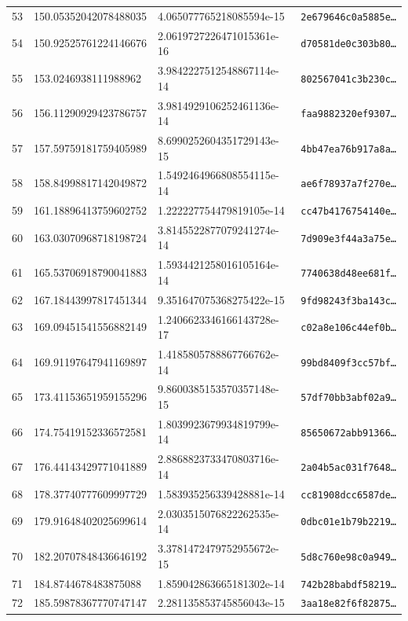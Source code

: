 \documentclass[11pt]{article}
\begin{document}
\begin{center}
\begin{longtable}{rlll}
53 & 150.05352042078488035 & 4.065077765218085594e-15 & \texttt{2e679646c0a5885e\dots} \\
54 & 150.92525761224146676 & 2.0619727226471015361e-16 & \texttt{d70581de0c303b80\dots} \\
55 & 153.0246938111988962 & 3.9842227512548867114e-14 & \texttt{802567041c3b230c\dots} \\
56 & 156.11290929423786757 & 3.9814929106252461136e-14 & \texttt{faa9882320ef9307\dots} \\
57 & 157.59759181759405989 & 8.6990252604351729143e-15 & \texttt{4bb47ea76b917a8a\dots} \\
58 & 158.84998817142049872 & 1.5492464966808554115e-14 & \texttt{ae6f78937a7f270e\dots} \\
59 & 161.18896413759602752 & 1.222227754479819105e-14 & \texttt{cc47b4176754140e\dots} \\
60 & 163.03070968718198724 & 3.8145522877079241274e-14 & \texttt{7d909e3f44a3a75e\dots} \\
61 & 165.53706918790041883 & 1.5934421258016105164e-14 & \texttt{7740638d48ee681f\dots} \\
62 & 167.18443997817451344 & 9.351647075368275422e-15 & \texttt{9fd98243f3ba143c\dots} \\
63 & 169.09451541556882149 & 1.2406623346166143728e-17 & \texttt{c02a8e106c44ef0b\dots} \\
64 & 169.91197647941169897 & 1.4185805788867766762e-14 & \texttt{99bd8409f3cc57bf\dots} \\
65 & 173.41153651959155296 & 9.8600385153570357148e-15 & \texttt{57df70bb3abf02a9\dots} \\
66 & 174.75419152336572581 & 1.8039923679934819799e-14 & \texttt{85650672abb91366\dots} \\
67 & 176.44143429771041889 & 2.8868823733470803716e-14 & \texttt{2a04b5ac031f7648\dots} \\
68 & 178.37740777609997729 & 1.583935256339428881e-14 & \texttt{cc81908dcc6587de\dots} \\
69 & 179.91648402025699614 & 2.0303515076822262535e-14 & \texttt{0dbc01e1b79b2219\dots} \\
70 & 182.20707848436646192 & 3.3781472479752955672e-15 & \texttt{5d8c760e98c0a949\dots} \\
71 & 184.8744678483875088 & 1.859042863665181302e-14 & \texttt{742b28babdf58219\dots} \\
72 & 185.59878367770747147 & 2.281135853745856043e-15 & \texttt{3aa18e82f6f82875\dots} \\

\end{longtable}
\end{center}
\end{document}
